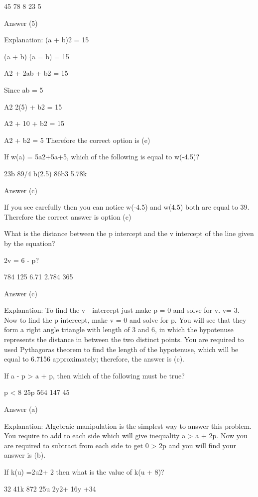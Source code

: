         45
        78
        8
        23
        5 

    Answer (5)

    Explanation: (a + b)2 = 15

    (a + b) (a = b) = 15

    A2 + 2ab + b2 = 15

    Since ab = 5

    A2 2(5) + b2 = 15

    A2 + 10 + b2 = 15

    A2 + b2 = 5 Therefore the correct option is (e)

    If w(a) = 5a2+5a+5, which of the following is equal to w(-4.5)?

        23b
        89/4
        b(2.5)
        86b3
        5.78k 

    Answer (c)

    If you see carefully then you can notice w(-4.5) and w(4.5) both are equal to 39. Therefore the correct answer is option (c)

    What is the distance between the p intercept and the v intercept of the line given by the equation?

    2v = 6 - p?

        784
        125
        6.71
        2.784
        365 

    Answer (c)

    Explanation: To find the v - intercept just make p = 0 and solve for v. v= 3. Now to find the p intercept, make v = 0 and solve for p. You will see that they form a right angle triangle with length of 3 and 6, in which the hypotenuse represents the distance in between the two distinct points. You are required to used Pythagoras theorem to find the length of the hypotenuse, which will be equal to 6.7156 approximately; therefore, the answer is (c).

    If a - p > a + p, then which of the following must be true?

        p < 8
        25p
        564
        147
        45 

    Answer (a)

    Explanation: Algebraic manipulation is the simplest way to answer this problem. You require to add to each side which will give inequality a > a + 2p. Now you are required to subtract from each side to get 0 > 2p and you will find your answer is (b).

    If k(u) =2u2+ 2 then what is the value of k(u + 8)?

        32
        41k
        872
        25u
        2y2+ 16y +34 

